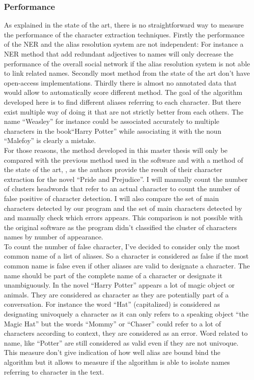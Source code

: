 \documentclass[a4paper, 12pt]{report}
\begin{document}
\subsubsection{Performance}
\label{performance}
As explained in the state of the art, there is no straightforward way to measure the performance of the character extraction techniques. 
Firstly the performance of the NER and the alias resolution system are not independent: 
For instance a NER method that add redundant adjectives to names will only decrease the performance of the overall social network 
if the alias resolution system is not able to link related names. 
Secondly most method from the state of the art don't have open-access implementations. 
Thirdly there is almost no annotated data that would allow to automatically score different method. 
The goal of the algorithm developed here is to find different aliases referring to each character. 
But there exist multiple way of doing it that are not strictly better from each others. 
The name ``Weasley'' for instance could be associated accurately to multiple characters in the book``Harry Potter'' while associating it with the noun ``Malefoy'' is clearly a mistake.\\

For those reasons, the method developed in this master thesis will only be compared with the previous method used in the software \citep{original} and with a method of the state of the art, \cite{character_meta},  as the authors provide the result of their character extraction for the novel ``Pride and Prejudice''. I will manually count the number of clusters headwords that refer to an actual character to count the number of false positive of character detection. I will also compare the set of main characters detected by our program and the set of main characters detected by \cite{character_meta} and manually check which errors appears. This comparison is not possible with the original software as the program didn't classified the cluster of characters names by number of appearance.\\

To count the number of  false character, I've decided to consider only the most common name of a list of aliases. 
So a character is considered as false if the most common name is false even if other aliases are valid to designate a character.
The name should be part of the complete name of a character or designate it unambiguously. In the novel ``Harry Potter'' appears a lot of magic object or animals. 
They are considered as character as they are potentially part of a conversation. 
For instance the word ``Hat'' (capitalized) is considered as designating univoquely a character as it can only refers to a speaking object ``the Magic Hat'' 
but the words ``Mommy'' or ``Chaser'' could refer to a lot of characters according to context, 
they are considered as an error. Word related to name, like ``Potter'' are still considered as valid even if they are not univoque. 
This measure don't give indication of how well alias are bound bind the algorithm but it allows to measure 
if the algorithm is able to isolate names referring to character in the text. \\
\end{document}
